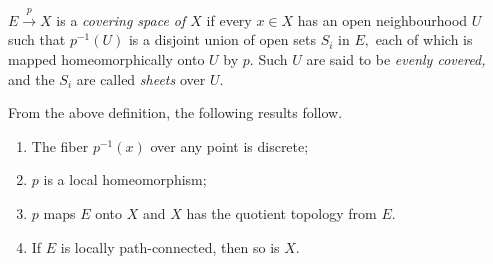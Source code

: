 \documentclass[12pt]{article}
\begin{document}
\begin{defn}
	$E \overset{p}{\longrightarrow} X$ is a \emph{covering space of $X$} if every $x \in X$ has an open neighbourhood $U$ such that $p^{-1}(U)$ is a disjoint union of open sets $S_i$ in $E,$ each of which is mapped homeomorphically onto $U$ by $p.$ Such $U$ are said to be \emph{evenly covered,} and the $S_i$ are called \emph{sheets} over $U.$
\end{defn}
\begin{prop}[Consequences]
	From the above definition, the following results follow.
	\begin{enumerate}
		\item The fiber $p^{-1}(x)$ over any point is discrete;
		\item $p$ is a local homeomorphism;
		\item $p$ maps $E$ onto $X$ and $X$ has the quotient topology from $E.$
		\item If $E$ is locally path-connected, then so is $X.$
	\end{enumerate}
\end{prop}
\end{document}
